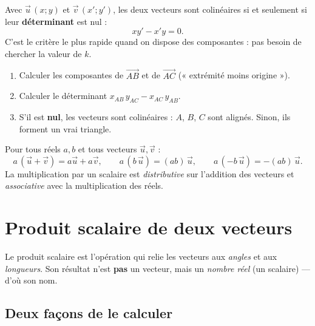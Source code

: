 \documentclass[11pt,a4paper]{article}
\newcommand{\vc}[1]{\overrightarrow{#1}}        %
\begin{document}
\begin{remarque}
Avec $\vec{u}\,(x;y)$ et $\vec{v}\,(x';y')$, les deux vecteurs sont colinéaires si et seulement si leur
\textbf{déterminant} est nul :
\[
  xy'-x'y=0.
\]
C'est le critère le plus rapide quand on dispose des composantes : pas besoin de chercher la valeur de $k$.
\end{remarque}

\begin{methode}
\begin{enumerate}[leftmargin=1.8em,topsep=2pt,itemsep=2pt]
  \item Calculer les composantes de $\vc{AB}$ et de $\vc{AC}$ (« extrémité moins origine »).
  \item Calculer le déterminant $x_{AB}\,y_{AC}-x_{AC}\,y_{AB}$.
  \item S'il est \textbf{nul}, les vecteurs sont colinéaires : $A$, $B$, $C$ sont alignés. Sinon, ils
        forment un vrai triangle.
\end{enumerate}
\end{methode}

\begin{theoreme}
Pour tous réels $a,b$ et tous vecteurs $\vec{u},\vec{v}$ :
\[
  a\,(\vec{u}+\vec{v})=a\vec{u}+a\vec{v},\qquad
  a\,(b\,\vec{u})=(ab)\,\vec{u},\qquad
  a\,(-b\,\vec{u})=-(ab)\,\vec{u}.
\]
La multiplication par un scalaire est \emph{distributive} sur l'addition des vecteurs et
\emph{associative} avec la multiplication des réels.
\end{theoreme}

\section{Produit scalaire de deux vecteurs}\label{sec:ps}
Le produit scalaire est l'opération qui relie les vecteurs aux \emph{angles} et aux \emph{longueurs}.
Son résultat n'est \textbf{pas} un vecteur, mais un \emph{nombre réel} (un scalaire) — d'où son nom.

\subsection{Deux façons de le calculer}
\end{document}
